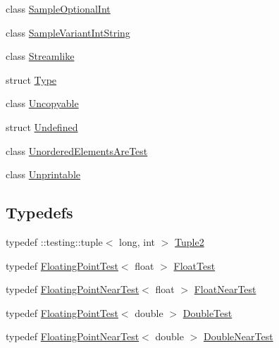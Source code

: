 \begin{DoxyCompactItemize}
\item 
class \mbox{\hyperlink{classtesting_1_1gmock__matchers__test_1_1SampleOptionalInt}{Sample\+Optional\+Int}}
\item 
class \mbox{\hyperlink{classtesting_1_1gmock__matchers__test_1_1SampleVariantIntString}{Sample\+Variant\+Int\+String}}
\item 
class \mbox{\hyperlink{classtesting_1_1gmock__matchers__test_1_1Streamlike}{Streamlike}}
\item 
struct \mbox{\hyperlink{structtesting_1_1gmock__matchers__test_1_1Type}{Type}}
\item 
class \mbox{\hyperlink{classtesting_1_1gmock__matchers__test_1_1Uncopyable}{Uncopyable}}
\item 
struct \mbox{\hyperlink{structtesting_1_1gmock__matchers__test_1_1Undefined}{Undefined}}
\item 
class \mbox{\hyperlink{classtesting_1_1gmock__matchers__test_1_1UnorderedElementsAreTest}{Unordered\+Elements\+Are\+Test}}
\item 
class \mbox{\hyperlink{classtesting_1_1gmock__matchers__test_1_1Unprintable}{Unprintable}}
\end{DoxyCompactItemize}
\subsection*{Typedefs}
\begin{DoxyCompactItemize}
\item 
typedef \+::testing\+::tuple$<$ long, int $>$ \mbox{\hyperlink{namespacetesting_1_1gmock__matchers__test_a8b82c859cd28da9e7f7d4c6091a3165c}{Tuple2}}
\item 
typedef \mbox{\hyperlink{classtesting_1_1gmock__matchers__test_1_1FloatingPointTest}{Floating\+Point\+Test}}$<$ float $>$ \mbox{\hyperlink{namespacetesting_1_1gmock__matchers__test_a145329e433869625f9f0e98a0cdfd7b4}{Float\+Test}}
\item 
typedef \mbox{\hyperlink{classtesting_1_1gmock__matchers__test_1_1FloatingPointNearTest}{Floating\+Point\+Near\+Test}}$<$ float $>$ \mbox{\hyperlink{namespacetesting_1_1gmock__matchers__test_a426b51f464dcb48033946e1bf3cc8795}{Float\+Near\+Test}}
\item 
typedef \mbox{\hyperlink{classtesting_1_1gmock__matchers__test_1_1FloatingPointTest}{Floating\+Point\+Test}}$<$ double $>$ \mbox{\hyperlink{namespacetesting_1_1gmock__matchers__test_a944cdd366ed240f29ae8e3ebc753ad5c}{Double\+Test}}
\item 
typedef \mbox{\hyperlink{classtesting_1_1gmock__matchers__test_1_1FloatingPointNearTest}{Floating\+Point\+Near\+Test}}$<$ double $>$ \mbox{\hyperlink{namespacetesting_1_1gmock__matchers__test_aea537d0183ccc65b5c49a75d711993c8}{Double\+Near\+Test}}
\end{DoxyCompactItemize}
